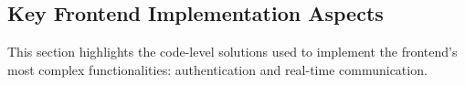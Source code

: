 \subsection{Key Frontend Implementation Aspects}

This section highlights the code-level solutions used to implement the frontend's most complex functionalities: authentication and real-time communication.


